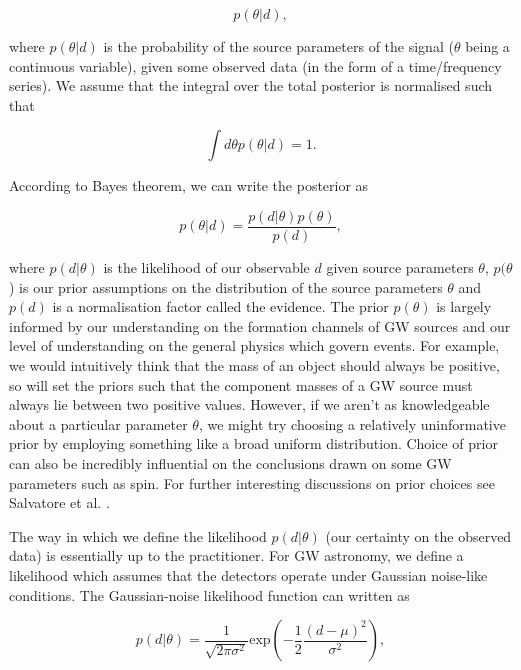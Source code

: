 %
%
\begin{equation}
    p(\theta | d),
\end{equation}

where $p(\theta | d)$ is the probability of the source parameters of the signal ($\theta$ being a continuous variable), given some observed data (in the form of a time/frequency series). We assume that the integral over the total posterior is normalised such that 

%
%
\begin{equation}
    \int d\theta p(\theta | d) = 1.
\end{equation}

According to Bayes theorem, we can write the posterior as 

%
%
\begin{equation}
    p(\theta | d) = \frac{p(d|\theta)p(\theta)}{p(d)},
\end{equation}

%
%
where $p(d|\theta)$ is the likelihood of our observable $d$ given source parameters $\theta$, $p(\theta$) is our prior assumptions on the distribution of the source parameters $\theta$ and $p(d)$ is a normalisation factor called the evidence. The prior $p(\theta)$ is largely informed by our understanding on the formation channels of \ac{GW} sources and our level of understanding on the general physics which govern events. For example, we would intuitively think that the mass of an object should always be positive, so will set the priors such that the component masses of a \ac{GW} source must always lie between two positive values. However, if we aren't as knowledgeable about a particular parameter $\theta$, we might try choosing a relatively uninformative prior by employing something like a broad uniform distribution. Choice of prior can also be incredibly influential on the conclusions drawn on some \ac{GW} parameters such as spin. For further interesting discussions on prior choices see Salvatore et al. \cite{PhysRevLett.119.251103}.

%
%
The way in which we define the likelihood $p(d|\theta)$ (our certainty on the observed data) is essentially up to the practitioner. For \ac{GW} astronomy, we define a likelihood which assumes that the detectors operate under Gaussian noise-like conditions. The Gaussian-noise likelihood function can written as 

\begin{equation}
    p(d|\theta) = \frac{1}{\sqrt{2\pi \sigma^2}} \textrm{exp}\left(-\frac{1}{2} 
    \frac{(d - \mu)^2}{\sigma^2}\right),
\end{equation}

